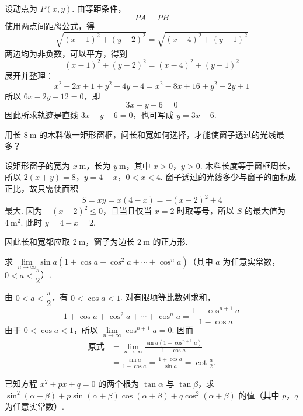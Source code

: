 \begin{solution}
设动点为 \(P(x,y)\). 由等距条件，
\[
PA=PB
\]
使用两点间距离公式，得
\[
\sqrt{(x-1)^2+(y-2)^2}=\sqrt{(x-4)^2+(y-1)^2}
\]
两边均为非负数，可以平方，得到
\[
(x-1)^2+(y-2)^2=(x-4)^2+(y-1)^2
\]
展开并整理：
\[
x^2-2x+1+y^2-4y+4=x^2-8x+16+y^2-2y+1
\]
所以 \(6x-2y-12=0\)，即
\[
3x-y-6=0
\]
因此所求轨迹是直线 \(3x-y-6=0\)，也可写成 \(y=3x-6\).
\end{solution}

\begin{problem}
用长 \(8\mathrm{~m}\) 的木料做一矩形窗框，问长和宽如何选择，才能使窗子透过的光线最多？
\end{problem}

\begin{solution}
设矩形窗子的宽为 \(x\mathrm{~m}\)，长为 \(y\mathrm{~m}\)，其中 \(x>0\)，\(y>0\). 木料长度等于窗框周长，所以
\(2(x+y)=8\)，\(y=4-x\)，\(0<x<4\).
窗子透过的光线多少与窗子的面积成正比，故只需使面积
\[
S=xy=x(4-x)=-(x-2)^2+4
\]
最大. 因为 \(-(x-2)^2\leqslant0\)，且当且仅当 \(x=2\) 时取等号，所以 \(S\) 的最大值为 \(4\mathrm{~m^2}\). 此时 \(y=4-x=2\).

因此长和宽都应取 \(2\mathrm{~m}\)，窗子为边长 \(2\mathrm{~m}\) 的正方形.
\end{solution}

\begin{problem}
求 \(\displaystyle\lim\limits_{n\to\infty}\sin a\left(1+\cos a+\cos^2a+\cdots+\cos^na\right)\)（其中 \(a\) 为任意实常数，\(0<a<\dfrac{\pi}{2}\)）.
\end{problem}

\begin{solution}
由 \(0<a<\dfrac{\pi}{2}\)，有 \(0<\cos a<1\). 对有限项等比数列求和，
\[
1+\cos a+\cos^2a+\cdots+\cos^na=\frac{1-\cos^{n+1}a}{1-\cos a}
\]
由于 \(0<\cos a<1\)，所以 \(\displaystyle\lim\limits_{n\to\infty}\cos^{n+1}a=0\). 因而
\[
\begin{aligned}
\text{原式}
&=\lim\limits_{n\to\infty}\frac{\sin a\left(1-\cos^{n+1}a\right)}{1-\cos a} \\
&=\frac{\sin a}{1-\cos a}
=\frac{1+\cos a}{\sin a}
=\cot\frac{a}{2}.
\end{aligned}
\]
\end{solution}

\begin{problem}
已知方程 \(x^2+px+q=0\) 的两个根为 \(\tan\alpha\) 与 \(\tan\beta\)，求 \(\sin^2\left(\alpha+\beta\right)+p\sin\left(\alpha+\beta\right)\cos\left(\alpha+\beta\right)+q\cos^2\left(\alpha+\beta\right)\) 的值（其中 \(p\)，\(q\) 为任意实常数）.
\end{problem}

